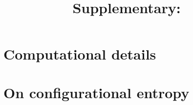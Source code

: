 

\title{Supplementary: \titletext}



    \maketitle

    \section{Computational details}
        \label{sec:computational}
        

    \section{On configurational entropy}
        \label{sec:configurational}
        

    
    


